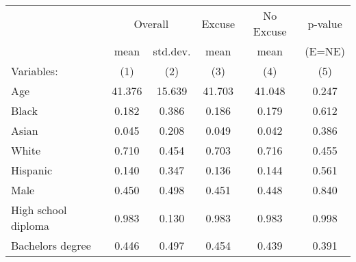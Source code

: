 \begin{table}[!ht]
\centering
\label{t:1-balance}
\vspace*{2mm}
\begin{threeparttable}
\begin{tabular}{lccccc}
\toprule
 & \multicolumn{2}{c}{Overall} & Excuse & No Excuse & p-value \\
 \cmidrule(r){2-3} \cmidrule(lr){4-4} \cmidrule(lr){5-5} \cmidrule(lr){6-6} 
 & mean & std.dev. & mean & mean & (E=NE) \\
 \cmidrule(r){2-2} \cmidrule(lr){3-3} \cmidrule(lr){4-4} \cmidrule(lr){5-5} \cmidrule(l){6-6} 
  Variables: & (1) & (2) & (3) & (4) & (5) \\ \midrule \midrule
Age & 41.376 & 15.639 & 41.703 & 41.048 & 0.247 \\
\addlinespace
Black & 0.182 & 0.386 & 0.186 & 0.179 & 0.612 \\
Asian & 0.045 & 0.208 & 0.049 & 0.042 & 0.386 \\
White & 0.710 & 0.454 & 0.703 & 0.716 & 0.455 \\
Hispanic & 0.140 & 0.347 & 0.136 & 0.144 & 0.561 \\
\addlinespace
Male & 0.450 & 0.498 & 0.451 & 0.448 & 0.840 \\
\addlinespace
High school diploma & 0.983 & 0.130 & 0.983 & 0.983 & 0.998 \\
Bachelors degree & 0.446 & 0.497 & 0.454 & 0.439 & 0.391 \\
 \midrule
\bottomrule
\end{tabular}
\end{threeparttable} \end{table}
